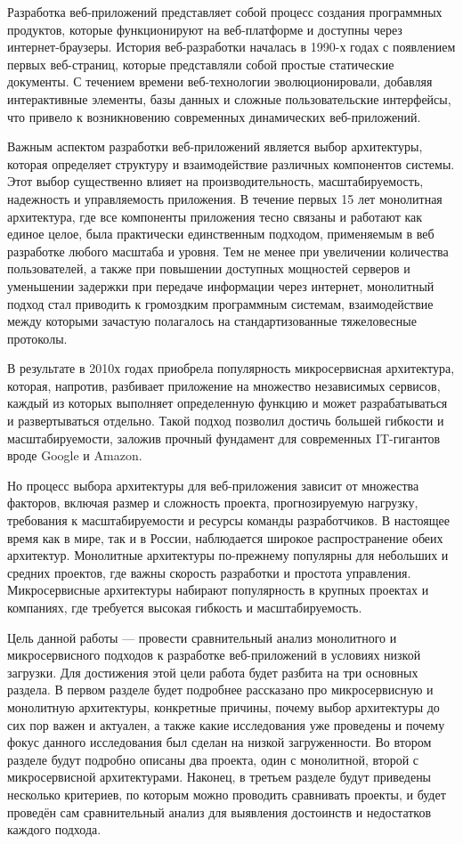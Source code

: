 
Разработка веб-приложений представляет собой процесс создания программных продуктов, которые функционируют на веб-платформе и доступны через интернет-браузеры. История веб-разработки началась в 1990-х годах с появлением первых веб-страниц, которые представляли собой простые статические документы. С течением времени веб-технологии эволюционировали, добавляя интерактивные элементы, базы данных и сложные пользовательские интерфейсы, что привело к возникновению современных динамических веб-приложений.

Важным аспектом разработки веб-приложений является выбор архитектуры, которая определяет структуру и взаимодействие различных компонентов системы. Этот выбор существенно влияет на производительность, масштабируемость, надежность и управляемость приложения. В течение первых 15 лет монолитная архитектура, где все компоненты приложения тесно связаны и работают как единое целое, была практически единственным подходом, применяемым в веб разработке любого масштаба и уровня. Тем не менее при увеличении количества пользователей, а также при повышении доступных мощностей серверов и уменьшении задержки при передаче информации через интернет, монолитный подход стал приводить к громоздким программным системам, взаимодействие между которыми зачастую полагалось на стандартизованные тяжеловесные протоколы.

В результате в 2010х годах приобрела популярность микросервисная архитектура, которая, напротив, разбивает приложение на множество независимых сервисов, каждый из которых выполняет определенную функцию и может разрабатываться и развертываться отдельно. Такой подход позволил достичь большей гибкости и масштабируемости, заложив прочный фундамент для современных IT-гигантов вроде Google и Amazon.

Но процесс выбора архитектуры для веб-приложения зависит от множества факторов, включая размер и сложность проекта, прогнозируемую нагрузку, требования к масштабируемости и ресурсы команды разработчиков. В настоящее время как в мире, так и в России, наблюдается широкое распространение обеих архитектур. Монолитные архитектуры по-прежнему популярны для небольших и средних проектов, где важны скорость разработки и простота управления. Микросервисные архитектуры набирают популярность в крупных проектах и компаниях, где требуется высокая гибкость и масштабируемость.

Цель данной работы — провести сравнительный анализ монолитного и микросервисного подходов к разработке веб-приложений в условиях низкой загрузки. Для достижения этой цели работа будет разбита на три основных раздела. В первом разделе будет подробнее рассказано про микросервисную и монолитную архитектуры,  конкретные причины, почему выбор архитектуры до сих пор важен и актуален, а также какие исследования уже проведены и почему фокус данного исследования был сделан на низкой загруженности. Во втором разделе будут подробно описаны два проекта, один с монолитной, второй с микросервисной архитектурами. Наконец, в третьем разделе будут приведены несколько критериев, по которым можно проводить сравнивать проекты, и будет проведён сам сравнительный анализ для выявления достоинств и недостатков каждого подхода.

